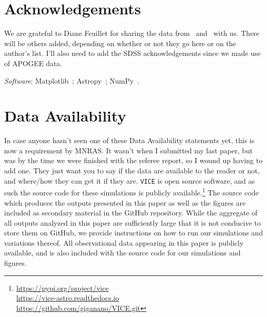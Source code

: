 \documentclass[fleqn, usenatbib]{mnras}
\begin{document}
\section{Acknowledgements} 
\label{sec:acknowledgements} 
We are grateful to Diane Feuillet for sharing the data 
from~\citet{Feuillet2018} and~\citet{Feuillet2019} with us. {\color{red} There 
will be others added, depending on whether or not they go here or on the 
author's list. I'll also need to add the SDSS acknowledgements since we made 
use of APOGEE data.} 
\par 
\textit{Software}: Matplotlib~\citep{Matplotlib}; Astropy~\citep{Astropy2013, 
Astropy2018}; NumPy~\citep{NumPy}. 

\section{Data Availability} 
{\color{red} In case anyone hasn't seen one of these Data Availability 
statements yet, this is now a requirement by MNRAS. It wasn't when I submitted 
my last paper, but was by the time we were finished with the referee report, 
so I wound up having to add one. They just want you to say if the data are 
available to the reader or not, and where/how they can get it if they are. }
\texttt{VICE} is open source software, and as such the source code for these 
simulations is publicly available.\footnote{
	\url{https://pypi.org/project/vice} \\ 
	\url{https://vice-astro.readthedocs.io} \\ 
	\url{https://github.com/giganano/VICE.git} 
} The source code which produces the outputs presented in this paper as well as 
the figures are included as secondary material in the GitHub repository. 
While the aggregate of all outputs analyzed in this paper are sufficiently 
large that it is not conducive to store them on GitHub, we provide instructions 
on how to run our simulations and variations thereof. All observational data 
appearing in this paper is publicly available, and is also included with the 
source code for our simulations and figures. 
\end{document}
